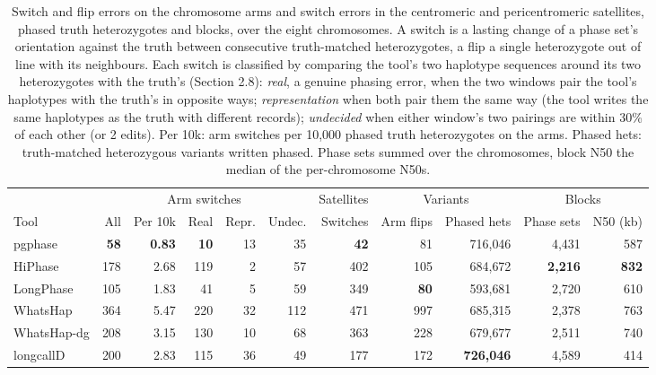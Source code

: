 \begin{table}[t]
\caption{Switch and flip errors on the chromosome arms and switch errors in the centromeric and pericentromeric satellites, phased truth heterozygotes and blocks, over the eight chromosomes. A switch is a lasting change of a phase set's orientation against the truth between consecutive truth-matched heterozygotes, a flip a single heterozygote out of line with its neighbours. Each switch is classified by comparing the tool's two haplotype sequences around its two heterozygotes with the truth's (Section 2.8): \emph{real}, a genuine phasing error, when the two windows pair the tool's haplotypes with the truth's in opposite ways; \emph{representation} when both pair them the same way (the tool writes the same haplotypes as the truth with different records); \emph{undecided} when either window's two pairings are within 30\% of each other (or 2 edits). Per 10k: arm switches per 10{,}000 phased truth heterozygotes on the arms. Phased hets: truth-matched heterozygous variants written phased. Phase sets summed over the chromosomes, block N50 the median of the per-chromosome N50s.}\label{tab:switches}
\centering\footnotesize
\setlength{\tabcolsep}{4pt}
\begin{tabular}{@{}lrrrrrrrrrr@{}}
\toprule
 & \multicolumn{5}{c}{Arm switches} & \multicolumn{1}{c}{Satellites} & \multicolumn{2}{c}{Variants} & \multicolumn{2}{c}{Blocks} \\ \cmidrule(lr){2-6}\cmidrule(lr){7-7}\cmidrule(lr){8-9}\cmidrule(lr){10-11}
Tool & All & Per 10k & Real & Repr. & Undec. & Switches & Arm flips & Phased hets & Phase sets & N50 (kb) \\
\midrule
pgphase & \textbf{58} & \textbf{0.83} & \textbf{10} & 13 & 35 & \textbf{42} & 81 & 716{,}046 & 4{,}431 & 587 \\
HiPhase & 178 & 2.68 & 119 & 2 & 57 & 402 & 105 & 684{,}672 & \textbf{2{,}216} & \textbf{832} \\
LongPhase & 105 & 1.83 & 41 & 5 & 59 & 349 & \textbf{80} & 593{,}681 & 2{,}720 & 610 \\
WhatsHap & 364 & 5.47 & 220 & 32 & 112 & 471 & 997 & 685{,}315 & 2{,}378 & 763 \\
WhatsHap-dg & 208 & 3.15 & 130 & 10 & 68 & 363 & 228 & 679{,}677 & 2{,}511 & 740 \\
longcallD & 200 & 2.83 & 115 & 36 & 49 & 177 & 172 & \textbf{726{,}046} & 4{,}589 & 414 \\
\bottomrule
\end{tabular}
\end{table}
